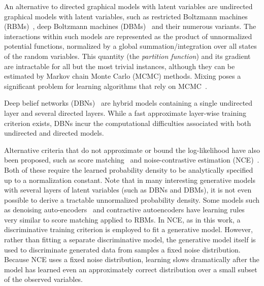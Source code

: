 \documentclass{article} %
\begin{document}

An alternative to directed graphical models with latent variables are undirected graphical models
with latent variables, such as restricted Boltzmann machines (RBMs)~\citep{Smolensky86,Hinton06}, 
deep Boltzmann machines (DBMs)~\citep{Salakhutdinov+Hinton-2009-small} and their numerous variants.
The interactions within such models are represented as the product of
unnormalized potential functions, normalized by a global
summation/integration over all states of the random variables.
This quantity (the \textit{partition function}) and
its gradient are intractable for all but the most trivial
instances, although they can be estimated by Markov chain Monte
Carlo (MCMC) methods. Mixing poses a significant problem for learning
algorithms that rely on
MCMC~\citep{Bengio-et-al-ICML2013,Bengio-et-al-ICML2014}.

Deep belief networks (DBNs)~\citep{Hinton06} are hybrid models containing a single undirected layer and several directed layers.
While a fast approximate layer-wise training criterion exists, DBNs incur the computational
difficulties associated with both undirected and directed models.

Alternative criteria that do not approximate or bound
the log-likelihood have also been proposed, such as score matching~\citep{Hyvarinen-2005-small}
and noise-contrastive estimation (NCE)~\citep{Gutmann+Hyvarinen-2010-small}.
Both of these require the learned probability density to be analytically specified
up to a normalization constant. Note that in many interesting generative models with several
layers of latent variables (such as
DBNs and DBMs), it is not even possible to derive a tractable unnormalized probability density.
Some models such as denoising auto-encoders~\citep{VincentPLarochelleH2008-small} and contractive
autoencoders have learning rules very similar to score matching applied to RBMs.
In NCE, as in this work, a discriminative training criterion is
employed to fit a generative model. However, rather than fitting a separate discriminative
model, the generative model itself is used to discriminate generated data from samples
a fixed noise distribution. Because NCE uses a fixed noise distribution, learning slows
dramatically after the model has learned even an approximately correct distribution over
a small subset of the observed variables.
\end{document}
